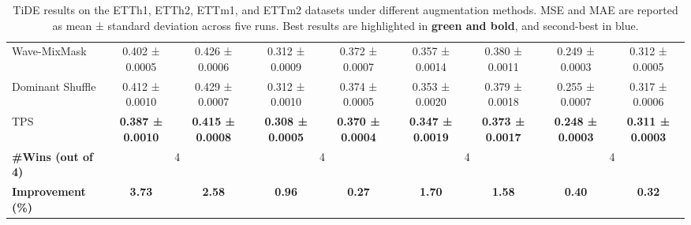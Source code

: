\begin{table}[h!]
\begin{adjustbox}{max width=\textwidth}
\begin{tabular}{l|cc|cc|cc|cc}
        Wave-MixMask & \cellcolor{secondcolor}0.402 ± 0.0005 & \cellcolor{secondcolor}0.426 ± 0.0006 & 0.312 ± 0.0009 & 0.372 ± 0.0007 & 0.357 ± 0.0014 & 0.380 ± 0.0011 & \cellcolor{secondcolor}0.249 ± 0.0003 & 0.312 ± 0.0005 \\
        Dominant Shuffle  & 0.412 ± 0.0010 & 0.429 ± 0.0007 & 0.312 ± 0.0010 & 0.374 ± 0.0005 & \cellcolor{secondcolor}0.353 ± 0.0020 & 0.379 ± 0.0018 & 0.255 ± 0.0007 & 0.317 ± 0.0006 \\
    TPS   & \cellcolor{bestcolor}\textbf{0.387 ± 0.0010} & \cellcolor{bestcolor}\textbf{0.415 ± 0.0008} & \cellcolor{bestcolor}\textbf{0.308 ± 0.0005} & \cellcolor{bestcolor}\textbf{0.370 ± 0.0004} & \cellcolor{bestcolor}\textbf{0.347 ± 0.0019} & \cellcolor{bestcolor}\textbf{0.373 ± 0.0017} & \cellcolor{bestcolor}\textbf{0.248 ± 0.0003} & \cellcolor{bestcolor}\textbf{0.311 ± 0.0003} \\
    \midrule
    \textbf{\#Wins (out of 4)} & \multicolumn{2}{c|}{4} & \multicolumn{2}{c|}{4} & \multicolumn{2}{c|}{4} & \multicolumn{2}{c}{4} \\
    \textbf{Improvement (\%)} & \cellcolor{bestcolor} \textbf{3.73} & \cellcolor{bestcolor} \textbf{2.58} & \cellcolor{bestcolor} \textbf{0.96} & \cellcolor{bestcolor} \textbf{0.27} & \cellcolor{bestcolor} \textbf{1.70} & \cellcolor{bestcolor} \textbf{1.58} & \cellcolor{bestcolor} \textbf{0.40} & \cellcolor{bestcolor} \textbf{0.32} \\
    \bottomrule
\end{tabular}
\end{adjustbox}
\caption{TiDE results on the ETTh1, ETTh2, ETTm1, and ETTm2 datasets under different augmentation methods. MSE and MAE are reported as mean ± standard deviation across five runs. Best results are highlighted in \textbf{green and bold}, and second-best in blue.}
\label{tb: tide1}
\end{table}




